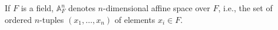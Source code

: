 If $F$ is a field, $\mathbb{A}_F^n$ denotes $n$-dimensional affine space over $F$, i.e., the set of ordered $n$-tuples $(x_1, \ldots, x_n)$ of elements $x_i \in F$.